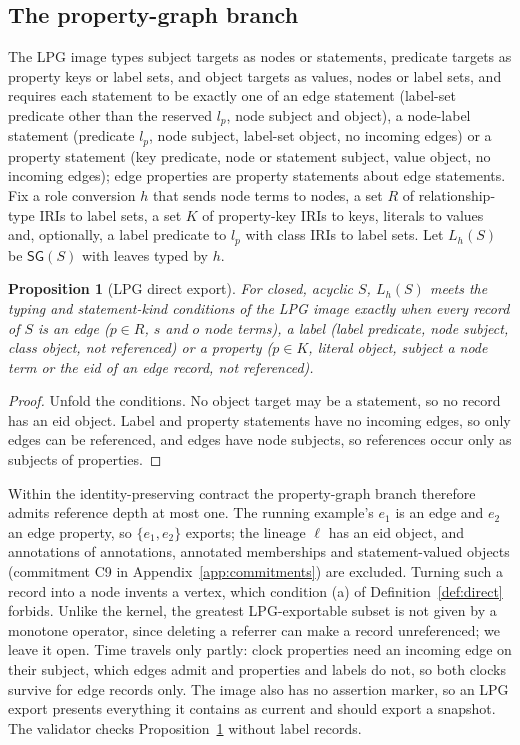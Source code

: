 \documentclass[11pt]{article}
\theoremstyle{plain}
\newtheorem{proposition}[theorem]{Proposition}
\theoremstyle{definition}
\theoremstyle{remark}
\newcommand{\SG}{\mathsf{SG}}
\begin{document}
\subsection{The property-graph branch}
The LPG image \cite[Def.~5.3]{gelling2023bridging} types subject targets as nodes
or statements, predicate targets as property keys or label sets, and object targets
as values, nodes or label sets, and requires each statement to be exactly one of an
edge statement (label-set predicate other than the reserved $l_p$, node subject and
object), a node-label statement (predicate $l_p$, node subject, label-set object, no
incoming edges) or a property statement (key predicate, node or statement subject,
value object, no incoming edges); edge properties are property statements about edge
statements. Fix a role conversion $h$ that sends node terms to nodes, a set
$R$ of relationship-type IRIs to label sets, a set $K$ of property-key IRIs to keys,
literals to values and, optionally, a label predicate to $l_p$ with class IRIs to
label sets. Let $L_h(S)$ be $\SG(S)$ with leaves typed by $h$.

\begin{proposition}[LPG direct export]\label{prop:lpg}
For closed, acyclic $S$, $L_h(S)$ meets the typing and statement-kind conditions of
the LPG image exactly when every record of $S$ is an \emph{edge} ($p\in R$, $s$ and
$o$ node terms), a \emph{label} (label predicate, node subject, class object, not
referenced) or a \emph{property} ($p\in K$, literal object, subject a node term or
the eid of an edge record, not referenced).
\end{proposition}
\begin{proof}
Unfold the conditions. No object target may be a statement, so no record has an eid
object. Label and property statements have no incoming edges, so only edges can be
referenced, and edges have node subjects, so references occur only as subjects of
properties.
\end{proof}

Within the identity-preserving contract the property-graph branch therefore admits
reference depth at most one. The running example's $e_1$ is an edge and $e_2$ an edge
property, so $\{e_1,e_2\}$ exports; the lineage $\ell$ has an eid object, and
annotations of annotations, annotated memberships and statement-valued objects
(commitment C9 in Appendix~\ref{app:commitments}) are excluded. Turning such a
record into a node invents a vertex, which condition (a) of
Definition~\ref{def:direct} forbids. Unlike the kernel, the greatest LPG-exportable
subset is not given by a monotone operator, since deleting a referrer can make a
record unreferenced; we leave it open. Time travels only partly: clock properties
need an incoming edge on their subject, which edges admit and properties and labels
do not, so both clocks survive for edge records only. The image also has no
assertion marker, so an LPG export presents everything it contains as current and
should export a snapshot. The validator checks Proposition~\ref{prop:lpg} without
label records.
\end{document}
